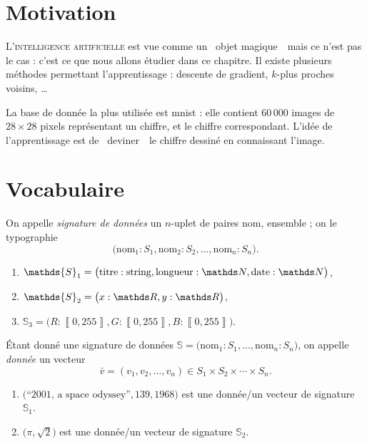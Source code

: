 \section{Motivation}

\lettrine{L}{'intelligence artificielle} est vue comme un \guillemotleft~objet magique~\guillemotright\ mais ce n'est pas le cas : c'est ce que nous allons étudier dans ce chapitre.
Il existe plusieurs méthodes permettant l'apprentissage : descente de gradient, $k$-plus proches voisins, \ldots

La base de donnée la plus utilisée est {\sc mnist}\/ : elle contient 60\,000 images de $28 \times 28$\/ pixels représentant un chiffre, et le chiffre correspondant.
L'idée de l'apprentissage est de \guillemotleft~deviner~\guillemotright\ le chiffre dessiné en connaissant l'image.

\section{Vocabulaire}

\begin{defn}
	On appelle {\it signature de données}\/ un $n$-uplet de paires nom, ensemble ; on le typographie \[
		\big(\text{nom}_1 : S_1, \text{nom}_2 : S_2, \ldots, \text{nom}_n : S_n\big)
	.\]
\end{defn}

\begin{exm}
	\begin{enumerate}
		\item $\mathds{S}_1 = \big(\text{titre} : \text{string}, \text{longueur} : \N, \text{date} : \N\big)$,
		\item $\mathds{S}_2 = \big(x : \R, y : \R\big)$,
		\item $\mathds{S}_3 = \big( R : \left\llbracket 0,255 \right\rrbracket, G : \left\llbracket 0, 255 \right\rrbracket, B : \left\llbracket 0,255 \right\rrbracket\big)$.
	\end{enumerate}
\end{exm}

\begin{defn}
	Étant donné une signature de données $\mathds{S} = \big(\text{nom}_1 : S_1, \ldots, \text{nom}_n : S_n\big)$, on appelle {\it donnée}\/ un vecteur \[
		\bar{v} = (v_1, v_2, \ldots, v_n) \in S_1 \times S_2 \times \cdots \times S_n
	.\]
\end{defn}

\begin{exm}
	\begin{enumerate}
		\item $\big(\text{``2001, a space odyssey''}, 139, 1968\big)$\/ est une donnée/un vecteur de signature~$\mathds{S}_1$.
		\item $\big(\pi, \sqrt{2}\big)$\/ est une donnée/un vecteur de signature $\mathds{S}_2$.
	\end{enumerate}
\end{exm}

